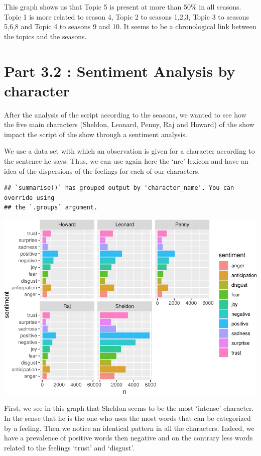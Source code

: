 \documentclass[
]{article}
\begin{document}
This graph shows us that Topic 5 is present at more than 50\% in all
seasons. Topic 1 is more related to season 4, Topic 2 to seasons 1,2,3,
Topic 3 to seasons 5,6,8 and Topic 4 to seasons 9 and 10. It seems to be
a chronological link between the topics and the seasons.

\hypertarget{part-3.2-sentiment-analysis-by-character}{%
\section{Part 3.2 : Sentiment Analysis by
character}\label{part-3.2-sentiment-analysis-by-character}}

After the analysis of the script according to the seasons, we wanted to
see how the five main characters (Sheldon, Leonard, Penny, Raj and
Howard) of the show impact the script of the show through a sentiment
analysis.

We use a data set with which an observation is given for a character
according to the sentence he says. Thus, we can use again here the `nrc'
lexicon and have an idea of the dispersions of the feelings for each of
our characters.

\begin{verbatim}
## `summarise()` has grouped output by 'character_name'. You can override using
## the `.groups` argument.
\end{verbatim}

\includegraphics{report_files/figure-latex/unnamed-chunk-66-1.pdf}

First, we see in this graph that Sheldon seems to be the most `intense'
character. In the sense that he is the one who uses the most words that
can be categorized by a feeling. Then we notice an identical pattern in
all the characters. Indeed, we have a prevalence of positive words then
negative and on the contrary less words related to the feelings `trust'
and `disgust'.
\end{document}
